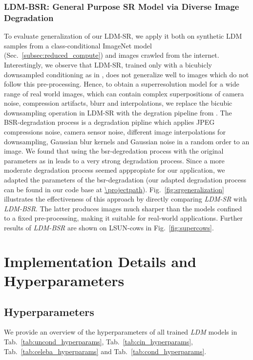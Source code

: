 \documentclass[10pt,twocolumn,letterpaper]{article}
\begin{document}
\subsubsection{LDM-BSR: General Purpose SR Model via Diverse Image Degradation}
\label{suppsubsubsec:bsr}
\srgeneralization
To evaluate generalization of our LDM-SR, we apply it both on synthetic LDM samples from a class-conditional ImageNet model (Sec.~\ref{subsec:reduced_compute}) and images crawled from the internet.
Interestingly, we observe that LDM-SR, trained only with a bicubicly
downsampled conditioning as in \cite{DBLP:journals/corr/abs-2104-07636}, does
not generalize well to images which do not follow this pre-processing.
Hence, to obtain a superresolution model for a wide range of real world images, which can contain complex superpositions of camera noise, compression artifacts, blurr and interpolations, we replace the bicubic downsampling operation in LDM-SR with the degration pipeline from \cite{bsrgan}. The BSR-degradation process is a degradation pipline which applies JPEG compressions noise, camera sensor noise, different image interpolations for downsampling, Gaussian blur kernels and Gaussian noise in a random order to an image. We found that using the bsr-degredation process with the original parameters as in \cite{bsrgan} leads to a very strong degradation process. Since a more moderate degradation process seemed apppropiate for our application, we adapted the parameters of the bsr-degradation (our adapted degradation process can be found in our code base at \url{\projectpath}).
Fig.~\ref{fig:srgeneralization} illustrates the effectiveness of this approach by directly comparing \emph{LDM-SR} with \emph{LDM-BSR}. The latter produces images much sharper than the models confined to a
fixed pre-processing, making it suitable for real-world applications.
Further results of \emph{LDM-BSR} are shown on LSUN-cows in Fig.~\ref{fig:supercows}.

%
%
%
%



%
%
%
\supercows
%
%
\suppsrimagenetbaseline
%
%
%
%
%

%
%
%
%

%
%

\newpage
\section{Implementation Details and Hyperparameters}
\subsection{Hyperparameters}
We provide an overview of the hyperparameters of all trained \emph{LDM} models in Tab.~\ref{tab:uncond_hyperparams}, Tab.~\ref{tab:cin_hyperparams}, Tab.~\ref{tab:celeba_hyperparams} and Tab.~\ref{tab:cond_hyperparams}.
\uncondhyperparams
\cinhyperparams
\celebahyperparams
\condhyperparams
\end{document}
